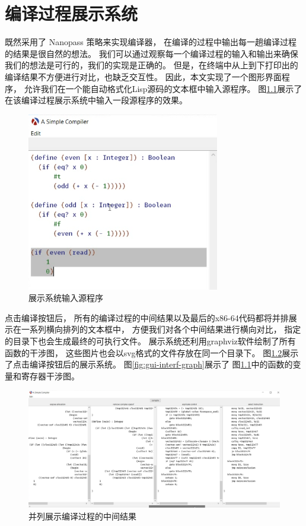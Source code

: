 
\chapter{编译过程展示系统}

既然采用了 Nanopass 策略来实现编译器，
在编译的过程中输出每一趟编译过程的结果是很自然的想法。
我们可以通过观察每一个编译过程的输入和输出来确保我们的想法是可行的，我们的实现是正确的。
但是，在终端中从上到下打印出的编译结果不方便进行对比，也缺乏交互性。
因此，本文实现了一个图形界面程序，
允许我们在一个能自动格式化Lisp源码的文本框中输入源程序。
图\ref{fig:gui-init}展示了在该编译过程展示系统中输入一段源程序的效果。
\begin{figure}[h]
\centering
\includegraphics[width=0.75\textwidth]{figures/gui-init2.png}
\caption{展示系统输入源程序}
\label{fig:gui-init}
\end{figure}

点击编译按钮后，
所有的编译过程的中间结果以及最后的x86-64代码都将并排展示在一系列横向排列的文本框中，
方便我们对各个中间结果进行横向对比，
指定的目录下也会生成最终的可执行文件。
展示系统还利用graphviz软件绘制了所有函数的干涉图，
这些图片也会以svg格式的文件存放在同一个目录下。
图\ref{fig:gui-compile}展示了点击编译按钮后的展示系统。
图\ref{fig:gui-interf-graph}展示了
图\ref{fig:gui-init}中的函数的变量和寄存器干涉图。

\begin{figure}[h]
\centering
\includegraphics[width=\textwidth]{figures/gui-compile.png}
\caption{并列展示编译过程的中间结果}
\label{fig:gui-compile}
\end{figure}

